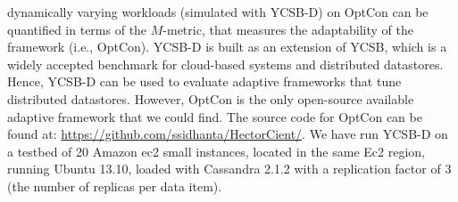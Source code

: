 \documentclass[conference]{IEEEtran}
\begin{document}
 dynamically varying workloads (simulated with YCSB-D) on OptCon can be quantified in terms of the $M$-metric, that measures the adaptability of the framework (i.e., OptCon). YCSB-D is built as an extension of YCSB, which is a widely accepted
 benchmark for cloud-based systems and distributed datastores. Hence, YCSB-D can be used to evaluate adaptive
 frameworks that tune distributed datastores. However, OptCon is the only open-source available adaptive framework that we could find.   %
 The source code  for OptCon can be found at: \url{https://github.com/ssidhanta/HectorCient/}.
 We have run  YCSB-D on a testbed of 20 Amazon ec2 small
instances, located in the same Ec2 region, running Ubuntu 13.10, loaded with Cassandra 2.1.2 %
 with a replication factor of 3 (the number of replicas per data item).
\end{document}
